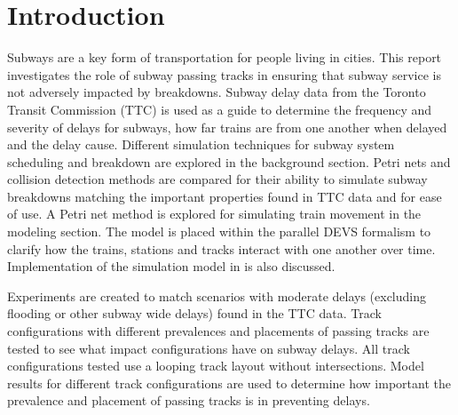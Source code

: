 \section{Introduction}

Subways are a key form of transportation for people living in cities. This
report investigates the role of subway passing tracks in ensuring that subway
service is not adversely impacted by breakdowns. Subway delay data from the Toronto Transit Commission (TTC) is used as a guide to determine the frequency and severity of delays for subways, how far trains are from one another when delayed and the delay cause. Different simulation techniques for subway system scheduling and breakdown are
explored in the background section. Petri nets and collision detection methods
are compared for their ability to simulate subway breakdowns matching the
important properties found in TTC data and for ease of use. A Petri net method is explored for simulating train movement in the modeling section. The model is placed within the parallel DEVS formalism to clarify how the trains, stations and tracks interact with one another over time. Implementation of the simulation model in  is also discussed.

Experiments are created to match scenarios with moderate delays (excluding
flooding or other subway wide delays) found in the TTC data. Track
configurations with different prevalences and placements of passing tracks are
tested to see what impact configurations have on subway delays. All track
configurations tested use a looping track layout without intersections. Model results for different track configurations are used to determine how
important the prevalence and placement of passing tracks is in preventing
delays. 